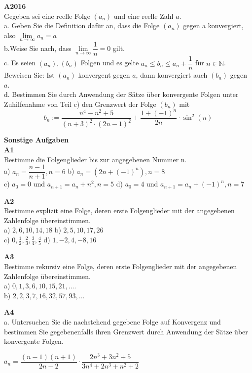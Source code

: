 \documentclass[landscape,twocolumn,a4paper]{article}
\begin{document}
\textbf{A2016} \\
Gegeben sei eine reelle Folge $(a_n)$ und eine reelle Zahl $a$. \\
a. Geben Sie die Definition dafür an, dass die Folge $(a_n)$ gegen a konvergiert, also $\lim \limits_{n \to \infty} a_n = a$ \\
b.Weise Sie nach, dass  $ \lim \limits_{n \to \infty} \dfrac{1}{n} = 0$ gilt. \\
c. Es seien $(a_n), (b_n)$ Folgen und es gelte $a_n \le b_n \le a_n + \dfrac{1}{n}$ für $n \in \mathbb{N}$.
Beweisen Sie: Ist $(a_n)$ konvergent gegen $a$, dann konvergiert auch $(b_n)$ gegen $a$. \\
d. Bestimmen Sie durch Anwendung der Sätze über konvergente Folgen unter Zuhilfenahme von Teil c) den Grenzwert der Folge $(b_n)$ mit 
$$b_n := \dfrac{n^4-n^2+5}{(n+3)^2 \cdot (2n-1)^2} + \dfrac{1+(-1)^n}{2n} \cdot  \sin^2(n)$$
\bigskip

\newpage

\textbf{Sonstige Aufgaben} \\

\textbf{A1} \\
Bestimme die Folgenglieder bis zur angegebenen Nummer n. \\
a) $a_n= \dfrac{n-1}{n+1}, n = 6$ \quad b) $a_n=(2n+(-1)^n), n=8$  \\
c) $a_0 = 0$ und $a_{n+1} = a_n + n^2, n = 5$ \quad
d) $a_0 = 4$ und $a_{n+1} = a_n +(-1)^n,  n = 7$
\bigskip

\textbf{A2} \\
Bestimme explizit eine Folge, deren erste Folgenglieder mit der angegebenen Zahlenfolge übereinstimmen. \\
a) $2,6,10,14,18$  \quad b) $2,5,10,17,26$  \\
c) $0,\frac{1}{2}, \frac{2}{3}, \frac{3}{4}, \frac{4}{5}$ \quad d) $1,-2,4,-8,16$ \quad
\bigskip


\textbf{A3} \\
Bestimme rekursiv eine Folge, deren erste Folgenglieder mit der angegebenen Zahlenfolge übereinstimmen. \\
a) $0,1,3,6,10,15,21,....$ \\
b) $2,2,3,7,16,32,57,93,...$ 
\bigskip


\textbf{A4} \\
a. Untersuchen Sie die nachstehend gegebene Folge auf Konvergenz und bestimmen Sie gegebenenfalls
ihren Grenzwert durch Anwendung der Sätze über konvergente Folgen. 

$a_n = \dfrac{(n-1)(n+1)}{2n-2} \cdot \dfrac{2n^3+3n^2+5}{3n^4+2n^3+n^2+2}$ 
\end{document}
